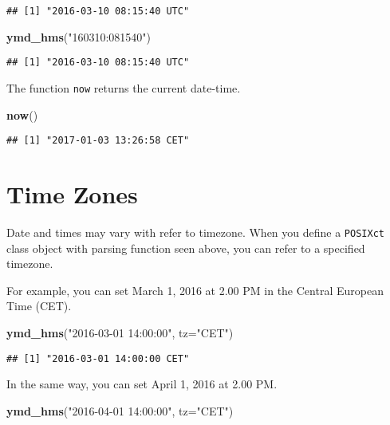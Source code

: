 \documentclass[]{book}
\newenvironment{Shaded}{\begin{snugshade}}{\end{snugshade}}
\newcommand{\KeywordTok}[1]{\textcolor[rgb]{0.13,0.29,0.53}{\textbf{{#1}}}}
\newcommand{\DataTypeTok}[1]{\textcolor[rgb]{0.13,0.29,0.53}{{#1}}}
\newcommand{\StringTok}[1]{\textcolor[rgb]{0.31,0.60,0.02}{{#1}}}
\newcommand{\NormalTok}[1]{{#1}}
\begin{document}
\begin{verbatim}
## [1] "2016-03-10 08:15:40 UTC"
\end{verbatim}

\begin{Shaded}
\begin{Highlighting}[]
\KeywordTok{ymd_hms}\NormalTok{(}\StringTok{"160310:081540"}\NormalTok{)}
\end{Highlighting}
\end{Shaded}

\begin{verbatim}
## [1] "2016-03-10 08:15:40 UTC"
\end{verbatim}

The function \texttt{now} returns the current date-time.

\begin{Shaded}
\begin{Highlighting}[]
\KeywordTok{now}\NormalTok{()}
\end{Highlighting}
\end{Shaded}

\begin{verbatim}
## [1] "2017-01-03 13:26:58 CET"
\end{verbatim}

\section{Time Zones}\label{time-zones}

Date and times may vary with refer to timezone. When you define a
\texttt{POSIXct} class object with parsing function seen above, you can
refer to a specified timezone.

For example, you can set March 1, 2016 at 2.00 PM in the Central
European Time (CET).

\begin{Shaded}
\begin{Highlighting}[]
\KeywordTok{ymd_hms}\NormalTok{(}\StringTok{"2016-03-01 14:00:00"}\NormalTok{, }\DataTypeTok{tz=}\StringTok{"CET"}\NormalTok{)}
\end{Highlighting}
\end{Shaded}

\begin{verbatim}
## [1] "2016-03-01 14:00:00 CET"
\end{verbatim}

In the same way, you can set April 1, 2016 at 2.00 PM.

\begin{Shaded}
\begin{Highlighting}[]
\KeywordTok{ymd_hms}\NormalTok{(}\StringTok{"2016-04-01 14:00:00"}\NormalTok{, }\DataTypeTok{tz=}\StringTok{"CET"}\NormalTok{)}
\end{Highlighting}
\end{Shaded}
\end{document}
